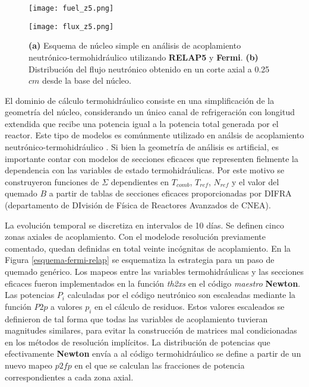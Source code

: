 \begin{figure}[ht]
	\begin{minipage}{0.5\linewidth}
		\centering
		\texttt{[image: fuel\_z5.png]}
	\end{minipage}
	\begin{minipage}{0.5\linewidth}
		\centering
		\texttt{[image: flux\_z5.png]}
	\end{minipage}
\caption[Núcleo simple en análisis de acoplamiento neutrónico-termohidráulico utilizando \textit{RELAP5} y \textit{Fermi}]
{\textbf{(a)} Esquema de núcleo simple en análisis de acoplamiento neutrónico-termohidráulico utilizando \textbf{RELAP5} y \textbf{Fermi}.
\textbf{(b)} Distribución del flujo neutrónico obtenido en un corte axial a 0.25 $cm$ desde la base del núcleo.
}
\label{fuel_z5}
\end{figure}
El dominio de cálculo termohidráulico consiste en una simplificación de la geometría del núcleo,
considerando un único canal de refrigeración con longitud extendida que recibe una potencia igual a la potencia total generada por el reactor.
Este tipo de modelos es comúnmente utilizado en análsis de acoplamiento neutrónico-termohidráulico \cite{pumita-relap}.
Si bien la geometría de análisis es artificial, 
es importante contar con modelos de secciones eficaces que representen fielmente la dependencia con las variables de estado termohidráulicas.
Por este motivo se construyeron funciones de $\Sigma$ dependientes en $T_{comb}$, $T_{ref}$, $N_{ref}$ y el valor del quemado $B$
a partir de tablas de secciones eficaces proporcionadas por DIFRA (departamento de DIvisión de Física de Reactores Avanzados de CNEA).

La evolución temporal se discretiza en intervalos de 10 días.
Se definen cinco zonas axiales de acoplamiento.
Con el modelode resolución previamente comentado, quedan definidas en total veinte incógnitas de acoplamiento.
En la Figura \ref{esquema-fermi-relap} se esquematiza la estrategia para un paso de quemado genérico.
Los mapeos entre las variables termohidráulicas y las secciones eficaces fueron implementados en la función \textit{th2xs} en el código \textit{maestro} \textbf{Newton}.
Las potencias $P_i$ calculadas por el código neutrónico son escaleadas mediante la función $P2p$ a valores $p_i$ en el cálculo de residuos.
Estos valores escaleados se definieron de tal forma que todas las variables de acoplamiento tuvieran magnitudes similares,
para evitar la construcción de matrices mal condicionadas en los métodos de resolución implícitos.
La distribución de potencias que efectivamente \textbf{Newton} envía a al código termohidráulico se define a partir de un nuevo mapeo $p2fp$
en el que se calculan las fracciones de potencia correspondientes a cada zona axial.


